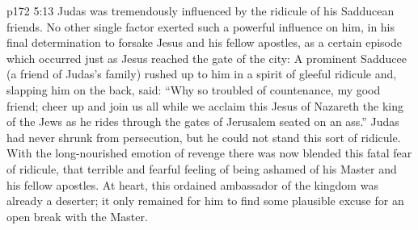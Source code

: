 \vs p172 5:13 Judas was tremendously influenced by the ridicule of his Sadducean friends. No other single factor exerted such a powerful influence on him, in his final determination to forsake Jesus and his fellow apostles, as a certain episode which occurred just as Jesus reached the gate of the city: A prominent Sadducee (a friend of Judas’s family) rushed up to him in a spirit of gleeful ridicule and, slapping him on the back, said: “Why so troubled of countenance, my good friend; cheer up and join us all while we acclaim this Jesus of Nazareth the king of the Jews as he rides through the gates of Jerusalem seated on an ass.” Judas had never shrunk from persecution, but he could not stand this sort of ridicule. With the long\hyp{}nourished emotion of revenge there was now blended this fatal fear of ridicule, that terrible and fearful feeling of being ashamed of his Master and his fellow apostles. At heart, this ordained ambassador of the kingdom was already a deserter; it only remained for him to find some plausible excuse for an open break with the Master.
\quizlink
